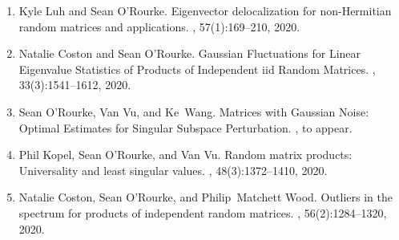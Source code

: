 \documentclass[letterpaper]{article}
\begin{document}
\begin{enumerate}
	\item Kyle Luh and Sean O'Rourke.
	\newblock Eigenvector delocalization for non-{H}ermitian random matrices and applications.
	, 57(1):169--210, 2020.  
	\item Natalie Coston and Sean O'Rourke.
	\newblock Gaussian {F}luctuations for {L}inear {E}igenvalue {S}tatistics of {P}roducts of {I}ndependent iid {R}andom {M}atrices.
	, 33(3):1541--1612, 2020.  
	\item Sean O'Rourke, Van Vu, and Ke~Wang.
	\newblock Matrices with Gaussian Noise: Optimal Estimates for Singular Subspace Perturbation. 
	, to appear.
	\item Phil Kopel, Sean O'Rourke, and Van Vu.
	\newblock Random matrix products: Universality and least singular values.
	, 48(3):1372--1410, 2020.
	\item Natalie Coston, Sean O'Rourke, and Philip~Matchett Wood.
	\newblock Outliers in the spectrum for products of independent random matrices.
	, 56(2):1284--1320, 2020.

\end{enumerate}
\end{document}
